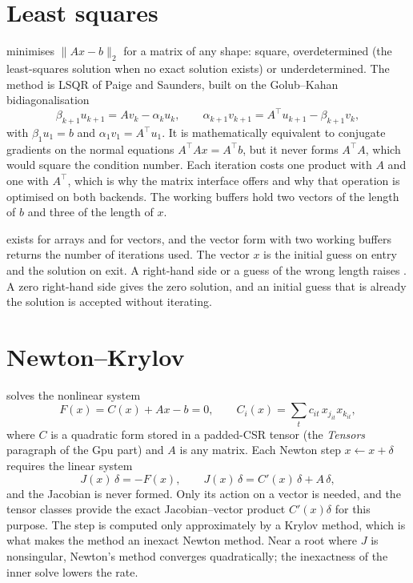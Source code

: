 \documentclass[main.tex]{subfiles}
\begin{document}
    \section{Least squares}
     minimises $\lVert Ax-b\rVert_2$ for a matrix of any shape: square, overdetermined (the least-squares solution when no exact solution exists) or underdetermined. The method is LSQR of Paige and Saunders, built on the Golub--Kahan bidiagonalisation
    \begin{equation}
        \beta_{k+1}u_{k+1}=Av_k-\alpha_ku_k,
        \qquad
        \alpha_{k+1}v_{k+1}=A^{\top}u_{k+1}-\beta_{k+1}v_k ,
    \end{equation}
    with $\beta_1u_1=b$ and $\alpha_1v_1=A^{\top}u_1$. It is mathematically equivalent to conjugate gradients on the normal equations $A^{\top}Ax=A^{\top}b$, but it never forms $A^{\top}A$, which would square the condition number. Each iteration costs one product with $A$ and one with $A^{\top}$, which is why the matrix interface offers  and why that operation is optimised on both backends. The working buffers hold two vectors of the length of $b$ and three of the length of $x$.

     exists for arrays and for vectors, and the vector form with two working buffers returns the number of iterations used. The vector $x$ is the initial guess on entry and the solution on exit. A right-hand side or a guess of the wrong length raises . A zero right-hand side gives the zero solution, and an initial guess that is already the solution is accepted without iterating.

    \section{Newton--Krylov}
     solves the nonlinear system
    \begin{equation}
        F(x) = C(x) + Ax - b = 0,
        \qquad
        C_i(x)=\sum_t c_{it}\,x_{j_{it}}x_{k_{it}} ,
    \end{equation}
    where $C$ is a quadratic form stored in a padded-CSR tensor (the \emph{Tensors} paragraph of the Gpu part) and $A$ is any matrix. Each Newton step $x\leftarrow x+\delta$ requires the linear system
    \begin{equation}
        J(x)\,\delta = -F(x),
        \qquad
        J(x)\,\delta = C'(x)\,\delta + A\,\delta ,
    \end{equation}
    and the Jacobian is never formed. Only its action on a vector is needed, and the tensor classes provide the exact Jacobian--vector product $C'(x)\delta$ for this purpose. The step is computed only approximately by a Krylov method, which is what makes the method an inexact Newton method. Near a root where $J$ is nonsingular, Newton's method converges quadratically; the inexactness of the inner solve lowers the rate.
\end{document}
